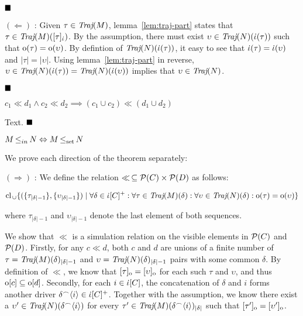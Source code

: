 $\Qed$

$(\Leftarrow)$ : Given $\tau \in \operatorname{\textit{Traj}}(M)$, lemma~\ref{lem:traj-part} states that $\tau \in \operatorname{\textit{Traj}}(M)([\tau]_{\dot{\iota}})$. By the assumption, there must exist $\upsilon \in \operatorname{\textit{Traj}}(N)(\dot{\iota}(\tau))$ such that $\mathrm{o}(\tau) = \mathrm{o}(\upsilon)$. By defintion of $\operatorname{\textit{Traj}}(N)(\dot{\iota}(\tau))$, it easy to see that $\dot{\iota}(\tau) = \dot{\iota}(\upsilon)$ and $| \tau | = | \upsilon |$. Using lemma~\ref{lem:traj-part} in reverse, $\upsilon \in \operatorname{\textit{Traj}}(N)(\dot{\iota}(\tau)) = \operatorname{\textit{Traj}}(N)(\dot{\iota}(\upsilon))$ implies that $\upsilon \in \operatorname{\textit{Traj}}(N)$.

$\Qed$

\begin{lemma} \label{lem:cl-union}
$c_{1} \ll d_{1} \wedge c_{2} \ll d_{2} \implies (c_{1} \cup c_{2}) \ll (d_{1} \cup d_{2})$
\end{lemma}

Text. $\Qed$

\begin{lemma} \label{lem:in-iff-sim}
$M \operatorname{\leq}_{in} N \Leftrightarrow M \operatorname{\operatorname{\leq}_{\textrm{set}}} N$
\end{lemma}

We prove each direction of the theorem separately:

$(\Rightarrow)$ : We define the relation $\ll \, \subseteq \mathcal{P}(C) \times \mathcal{P}(D)$ as follows:

\begin{equation*}
\textrm{cl}_{\, \cup} \{ ( \{ \tau_{| \delta | - 1} \} , \{ \upsilon_{| \delta | - 1} \} ) \mid \forall \delta \in \dot{\iota}[C]^{+} : \forall \tau \in \operatorname{\textit{Traj}}(M)(\delta) : \forall \upsilon \in \operatorname{\textit{Traj}}(N)(\delta) : \mathrm{o}(\tau) = \mathrm{o}(\upsilon) \}
\end{equation*}

\noindent where $\tau_{| \delta | - 1}$ and $\upsilon_{| \delta | - 1}$ denote the last element of both sequences.

We show that $\ll$ is a simulation relation on the visible elements in $\mathcal{P}(C)$ and $\mathcal{P}(D)$. Firstly, for any $c \ll d$, both $c$ and $d$ are unions of a finite number of $\tau = \operatorname{\textit{Traj}}(M)(\delta)_{| \delta | - 1}$ and $\upsilon = \operatorname{\textit{Traj}}(N)(\delta)_{| \delta | - 1}$ pairs with some common $\delta$. By definition of $\ll$, we know that $[\tau]_{\mathrm{o}} = [\upsilon]_{\mathrm{o}}$ for each such $\tau$ and $\upsilon$, and thus $\mathrm{o}[c] \subseteq \mathrm{o}[d]$. Secondly, for each $i \in \dot{\iota}[C]$, the concatenation of $\delta$ and $i$ forms another driver $\delta^{\frown} \langle i \rangle \in \dot{\iota}[C]^{+}$. Together with the assumption, we know there exist a $\upsilon' \in \operatorname{\textit{Traj}}(N)(\delta^{\frown} \langle i \rangle)$ for every $\tau' \in \operatorname{\textit{Traj}}(M)(\delta^{\frown} \langle i \rangle)_{| \delta |}$ such that $[\tau']_{\mathrm{o}} = [\upsilon']_{\mathrm{o}}$.

